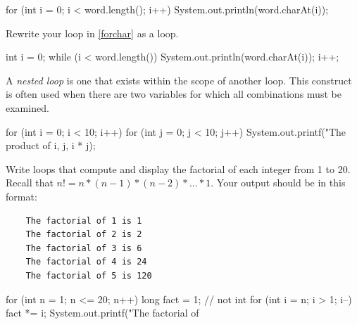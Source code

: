 \begin{answer}[6em]
\vspace{-1ex}
\begin{javaans}
    for (int i = 0; i < word.length(); i++) {
        System.out.println(word.charAt(i));
    }
\end{javaans}
\end{answer}


\Q Rewrite your  loop in \ref{forchar} as a  loop.

\begin{answer}[8em]
\vspace{-1ex}
\begin{javaans}
    int i = 0;
    while (i < word.length()) {
        System.out.println(word.charAt(i));
        i++;
    }
\end{javaans}
\end{answer}


\Q \label{nested}
A \emph{nested loop} is one that exists within the scope of another loop.
This construct is often used when there are two variables for which all combinations must be examined.

\begin{javalst}
    for (int i = 0; i < 10; i++) {
        for (int j = 0; j < 10; j++) {
            System.out.printf("The product of %
                              i, j, i * j);
        }
    }
\end{javalst}

Write loops that compute and display the factorial of each integer from 1 to 20.
Recall that $n! = n * (n-1) * (n-2) * \ldots * 1$.
Your output should be in this format:

\begin{verbatim}
    The factorial of 1 is 1
    The factorial of 2 is 2
    The factorial of 3 is 6
    The factorial of 4 is 24
    The factorial of 5 is 120
\end{verbatim}

\vspace{-3ex}

\begin{answer}[10em]
\begin{javaans}
    for (int n = 1; n <= 20; n++) {
        long fact = 1;  // not int
        for (int i = n; i > 1; i--) {
            fact *= i;
        }
        System.out.printf("The factorial of %
    }
\end{javaans}
\end{answer}
